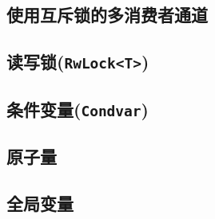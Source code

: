\subsection{使用互斥锁的多消费者通道}

\subsection{读写锁(\texttt{RwLock<T>})}

\subsection{条件变量(\texttt{Condvar})}

\subsection{原子量}\label{atomic}

\subsection{全局变量}\label{globalvar}